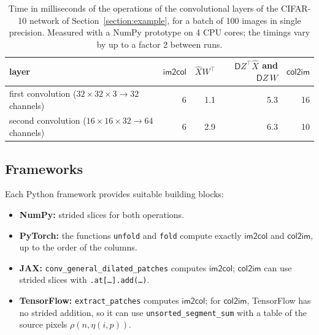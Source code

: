 \documentclass[twoside,11pt]{article}
\newcommand{\func}[1]{\ensuremath{\textsf{#1}}}  %
\newcommand{\Gradient}{\textsf{D}}
\newcommand{\im}{\func{im2col}}
\newcommand{\ci}{\func{col2im}}
\begin{document}
\begin{table}[htbp]
\centering
\caption{Time in milliseconds of the operations of the convolutional layers of the CIFAR-10 network of Section~\ref{section:example}, for a batch of 100 images in single precision. Measured with a NumPy prototype on 4 CPU cores; the timings vary by up to a factor 2 between runs.}
\label{table:timings}
\begin{tabular}{lrrrr}
\toprule
layer & \im & $\hat X W^\top$ & $\Gradient Z^\top \hat X$ and $\Gradient Z\, W$ & \ci \\
\midrule
first convolution ($32 \times 32 \times 3 \rightarrow 32$ channels)   & 6 & 1.1 & 5.3 & 16 \\
second convolution ($16 \times 16 \times 32 \rightarrow 64$ channels) & 6 & 2.9 & 6.3 & 10 \\
\bottomrule
\end{tabular}
\end{table}

\subsection{Frameworks}
Each Python framework provides suitable building blocks:
\begin{itemize}
\item \textbf{NumPy:} strided slices for both operations.
\item \textbf{PyTorch:} the functions \texttt{unfold} and \texttt{fold} compute exactly \im{} and \ci, up to the order of the columns.
\item \textbf{JAX:} \texttt{conv\_general\_dilated\_patches} computes \im; \ci{} can use strided slices with \texttt{.at[\ldots].add(\ldots)}.
\item \textbf{TensorFlow:} \texttt{extract\_patches} computes \im; for \ci, TensorFlow has no strided addition, so it can use \texttt{unsorted\_segment\_sum} with a table of the source pixels $\rho(n, \eta(i,p))$.
\end{itemize}
\end{document}
